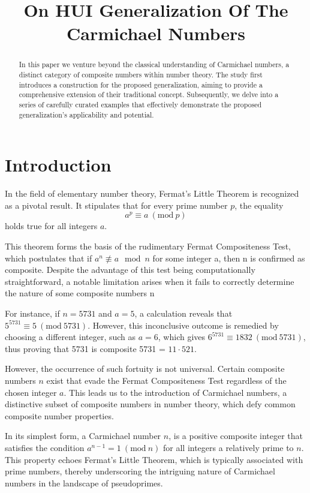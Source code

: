 \documentclass{article}
\date{}
\author{}
\title{On HUI Generalization Of The Carmichael Numbers}
\theoremstyle{definition}
\theoremstyle{definition}
\begin{document}
\maketitle
\begin{abstract}
In this paper we venture beyond the classical understanding of Carmichael numbers, a distinct category of composite numbers within 
number theory. The study first introduces a construction for the proposed generalization, aiming to provide a comprehensive extension 
of their traditional concept. Subsequently, we delve into a series of carefully curated examples that effectively demonstrate the 
proposed generalization's applicability and potential.
\end{abstract}

\section{Introduction}
In the field of elementary number theory, Fermat’s Little Theorem is recognized as a pivotal result. It stipulates that for every 
prime number $p$, the equality $$a^p \equiv a \ (\textrm{mod}\ p)$$ holds true for all integers $a$.

This theorem forms the basis of the rudimentary Fermat Compositeness Test, which postulates that if $a^n \not\equiv a \mod n$ for 
some integer a, then n is confirmed as composite. Despite the advantage of this test being computationally straightforward, a notable 
limitation arises when it fails to correctly determine the nature of some composite numbers n 

For instance, if $n = 5731$ and $a = 5$, a calculation reveals that $5^{5731} \equiv 5 \ (\textrm{mod}\ 5731)$. However, this 
inconclusive outcome is remedied by choosing a different integer, such as 
$a = 6$, which gives $6^{5731} \equiv 1832 \ (\textrm{mod}\ 5731)$, thus proving that 5731 is composite 5731 = $11 \cdot 521$. 

However, the occurrence of such fortuity is not universal. Certain composite numbers $n$ exist that evade the Fermat Compositeness 
Test regardless of the chosen integer $a.$ This leads us to the introduction of Carmichael numbers, a distinctive subset of composite 
numbers in number theory, which defy common composite number properties.

In its simplest form, a Carmichael number $n$, is a positive composite integer that satisfies the condition 
$a^{n-1} = 1\ (\textrm{mod}\ n)$ for all integers a relatively prime to $n.$ This property echoes Fermat's Little Theorem, which is 
typically associated with prime numbers, thereby underscoring the intriguing nature of Carmichael numbers in the landscape of 
pseudoprimes.
\end{document}
